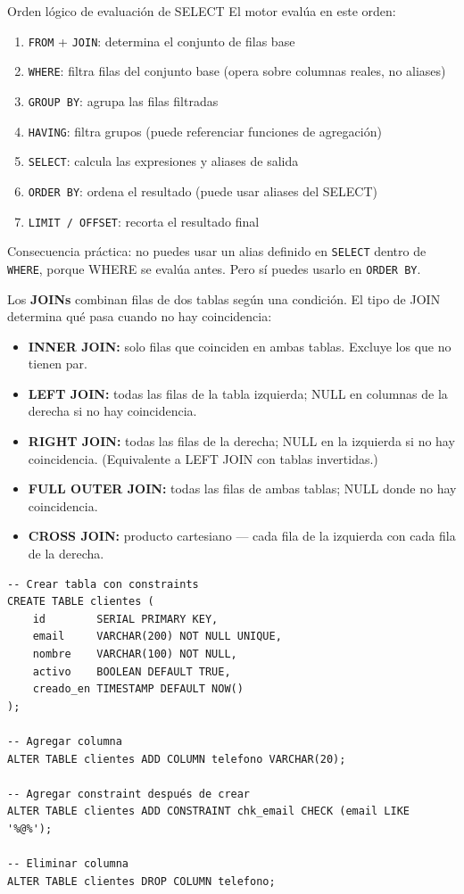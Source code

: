 \begin{tipbox}{Orden lógico de evaluación de SELECT}
El motor evalúa en este orden:
\begin{enumerate}
  \item \texttt{FROM} + \texttt{JOIN}: determina el conjunto de filas base
  \item \texttt{WHERE}: filtra filas del conjunto base (opera sobre columnas reales, no aliases)
  \item \texttt{GROUP BY}: agrupa las filas filtradas
  \item \texttt{HAVING}: filtra grupos (puede referenciar funciones de agregación)
  \item \texttt{SELECT}: calcula las expresiones y aliases de salida
  \item \texttt{ORDER BY}: ordena el resultado (puede usar aliases del SELECT)
  \item \texttt{LIMIT / OFFSET}: recorta el resultado final
\end{enumerate}
Consecuencia práctica: no puedes usar un alias definido en \texttt{SELECT} dentro de \texttt{WHERE}, porque WHERE se evalúa antes. Pero sí puedes usarlo en \texttt{ORDER BY}.
\end{tipbox}

Los \textbf{JOINs} combinan filas de dos tablas según una condición.
El tipo de JOIN determina qué pasa cuando no hay coincidencia:
\begin{itemize}
  \item \textbf{INNER JOIN:} solo filas que coinciden en ambas tablas. Excluye los que no tienen par.
  \item \textbf{LEFT JOIN:} todas las filas de la tabla izquierda; NULL en columnas de la derecha si no hay coincidencia.
  \item \textbf{RIGHT JOIN:} todas las filas de la derecha; NULL en la izquierda si no hay coincidencia. (Equivalente a LEFT JOIN con tablas invertidas.)
  \item \textbf{FULL OUTER JOIN:} todas las filas de ambas tablas; NULL donde no hay coincidencia.
  \item \textbf{CROSS JOIN:} producto cartesiano — cada fila de la izquierda con cada fila de la derecha.
\end{itemize}

\begin{lstlisting}[caption={DDL: CREATE, ALTER, DROP}]
-- Crear tabla con constraints
CREATE TABLE clientes (
    id        SERIAL PRIMARY KEY,
    email     VARCHAR(200) NOT NULL UNIQUE,
    nombre    VARCHAR(100) NOT NULL,
    activo    BOOLEAN DEFAULT TRUE,
    creado_en TIMESTAMP DEFAULT NOW()
);

-- Agregar columna
ALTER TABLE clientes ADD COLUMN telefono VARCHAR(20);

-- Agregar constraint después de crear
ALTER TABLE clientes ADD CONSTRAINT chk_email CHECK (email LIKE '%@%');

-- Eliminar columna
ALTER TABLE clientes DROP COLUMN telefono;
\end{lstlisting}


